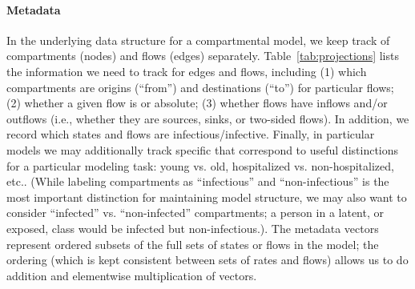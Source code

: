 \paragraph{Metadata}
  
In the underlying data structure for a compartmental model, we keep track of compartments (nodes) and flows (edges) separately. Table~\ref{tab:projections} lists the information we need to track for edges and flows, including (1) which compartments are origins (``from'') and destinations (``to'') for particular flows; (2) whether a given flow is \pc or absolute; (3) whether flows have inflows and/or outflows (i.e., whether they are sources, sinks, or two-sided flows). In addition, we record which states and flows are infectious/infective. Finally, in particular models we may additionally track specific  that correspond to useful distinctions for a particular modeling task: young vs. old, hospitalized vs. non-hospitalized, etc.. (While labeling compartments as ``infectious'' and ``non-infectious'' is the most important distinction for maintaining model structure, we may also want to consider ``infected'' vs. ``non-infected'' compartments; a person in a latent, or exposed, class would be infected but non-infectious.).
The metadata vectors represent ordered subsets of the full sets of states or flows in the model; the ordering (which is kept consistent between sets of \pc rates and flows) allows us to do addition and elementwise multiplication of vectors.

